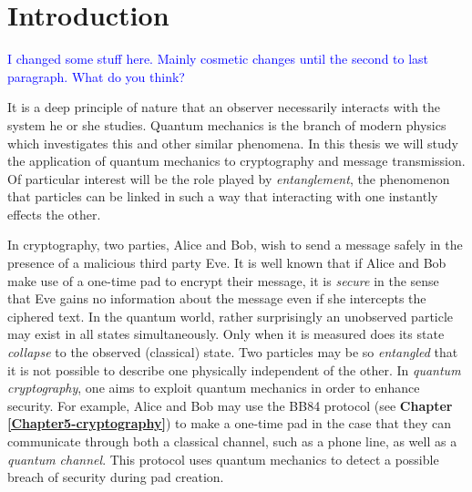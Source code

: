 
\chapter{Introduction} %

\label{Chapter1-introduction} %


\newcommand{\keyword}[1]{\textbf{#1}}
\newcommand{\tabhead}[1]{\textbf{#1}}
\newcommand{\code}[1]{\texttt{#1}}
\newcommand{\file}[1]{\texttt{\bfseries#1}}
\newcommand{\option}[1]{\texttt{\itshape#1}}


\textcolor{blue}{I changed some stuff here.  Mainly cosmetic changes until the second to last paragraph.  What do you think?}

It is a deep principle of nature that an observer necessarily interacts with the system he or she studies. Quantum mechanics is the branch of modern physics which investigates this and other similar phenomena. In this thesis we will study the application of quantum mechanics to cryptography and message transmission. Of particular interest will be the role played by {\emph{entanglement}}, the phenomenon that particles can be linked in such a way that interacting with one instantly effects the other. 

In cryptography, two parties, Alice and Bob, wish to send a message safely in the presence of a malicious third party Eve. It is well known that if Alice and Bob make use of a one-time pad to encrypt their message, it is \emph{secure} in the sense that Eve gains no information about the message even if she intercepts the ciphered text. 
In the quantum world, rather surprisingly an unobserved particle may exist in all states simultaneously. Only when it is measured does its state {\emph{collapse}} to the observed (classical) state.  Two particles may be so {\emph{entangled}} that it is not possible to describe one physically independent of the other.  In {\emph{quantum cryptography}}, one aims to exploit quantum mechanics in order to enhance security. For example, Alice and Bob may use the BB84 protocol (see \textbf{Chapter \ref{Chapter5-cryptography}}) to make a one-time pad in the case that they can communicate through both a classical channel, such as a phone line, as well as a \textit{quantum channel}. This protocol uses quantum mechanics to detect a possible breach of security during pad creation.  




